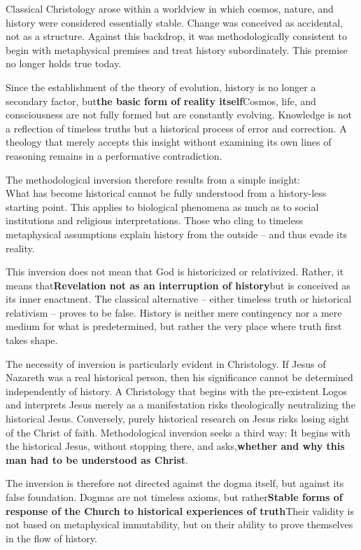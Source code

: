 \documentclass[
]{article}
\begin{document}
Classical Christology arose within a worldview in which cosmos, nature, and history were considered essentially stable. Change was conceived as accidental, not as a structure. Against this backdrop, it was methodologically consistent to begin with metaphysical premises and treat history subordinately. This premise no longer holds true today.

Since the establishment of the theory of evolution, history is no longer a secondary factor, but\textbf{the basic form of reality itself}Cosmos, life, and consciousness are not fully formed but are constantly evolving. Knowledge is not a reflection of timeless truths but a historical process of error and correction. A theology that merely accepts this insight without examining its own lines of reasoning remains in a performative contradiction.

The methodological inversion therefore results from a simple insight:\\
What has become historical cannot be fully understood from a history-less starting point. This applies to biological phenomena as much as to social institutions and religious interpretations. Those who cling to timeless metaphysical assumptions explain history from the outside -- and thus evade its reality.

This inversion does not mean that God is historicized or relativized. Rather, it means that\textbf{Revelation not as an interruption of history}but is conceived as its inner enactment. The classical alternative -- either timeless truth or historical relativism -- proves to be false. History is neither mere contingency nor a mere medium for what is predetermined, but rather the very place where truth first takes shape.

The necessity of inversion is particularly evident in Christology. If Jesus of Nazareth was a real historical person, then his significance cannot be determined independently of history. A Christology that begins with the pre-existent Logos and interprets Jesus merely as a manifestation risks theologically neutralizing the historical Jesus. Conversely, purely historical research on Jesus risks losing sight of the Christ of faith. Methodological inversion seeks a third way: It begins with the historical Jesus, without stopping there, and asks,\textbf{whether and why this man had to be understood as Christ}.

The inversion is therefore not directed against the dogma itself, but against its false foundation. Dogmas are not timeless axioms, but rather\textbf{Stable forms of response of the Church to historical experiences of truth}Their validity is not based on metaphysical immutability, but on their ability to prove themselves in the flow of history.
\end{document}
